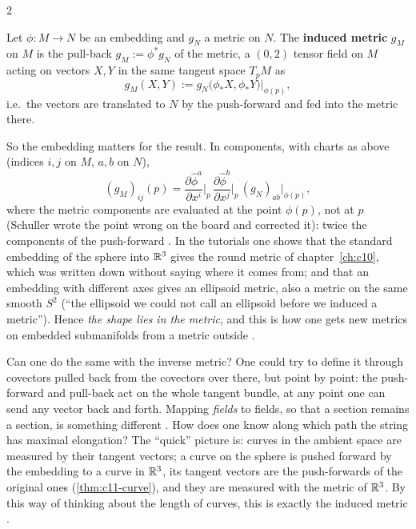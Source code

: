 \begin{paracol}{2}
\begin{definition}\label{def:c11-induced}
Let $\phi\colon M\to N$ be an embedding and $g_N$ a metric on $N$. The \textbf{induced metric} $g_M$ on $M$ is the pull-back $g_M:=\phi^*g_N$ of the metric, a $(0,2)$ tensor field on $M$ acting on vectors $X,Y$ in the same tangent space $T_pM$ as
\[
  g_M(X,Y):=g_N\bigl(\phi_*X,\phi_*Y\bigr)\big|_{\phi(p)},
\]
i.e.\ the vectors are translated to $N$ by the push-forward and fed into the metric there.
\end{definition}
So the embedding matters for the result. In components, with charts as above (indices $i,j$ on $M$, $a,b$ on $N$),
\[
  (g_M)_{ij}(p)=\frac{\partial\hat\phi^a}{\partial x^i}\Big|_p\,\frac{\partial\hat\phi^b}{\partial x^j}\Big|_p\,(g_N)_{ab}\big|_{\phi(p)},
\]
where the metric components are evaluated at the point $\phi(p)$, not at $p$ (Schuller wrote the point wrong on the board and corrected it): twice the components of the push-forward .
In the tutorials one shows that the standard embedding of the sphere into $\mathbb{R}^3$ gives the round metric of chapter~\ref{ch:c10}, which was written down without saying where it comes from; and that an embedding with different axes gives an ellipsoid metric, also a metric on the same smooth $S^2$ (``the ellipsoid we could not call an ellipsoid before we induced a metric''). Hence \emph{the shape lies in the metric}, and this is how one gets new metrics on embedded submanifolds from a metric outside .

\begin{coursenote}
Can one do the same with the inverse metric? One could try to define it through covectors pulled back from the covectors over there, but point by point: the push-forward and pull-back act on the whole tangent bundle, at any point one can send any vector back and forth. Mapping \emph{fields} to fields, so that a section remains a section, is something different .
How does one know along which path the string has maximal elongation? The ``quick'' picture is: curves in the ambient space are measured by their tangent vectors; a curve on the sphere is pushed forward by the embedding to a curve in $\mathbb{R}^3$, its tangent vectors are the push-forwards of the original ones (\cref{thm:c11-curve}), and they are measured with the metric of $\mathbb{R}^3$. By this way of thinking about the length of curves, this is exactly the induced metric .
\end{coursenote}


\end{paracol}
